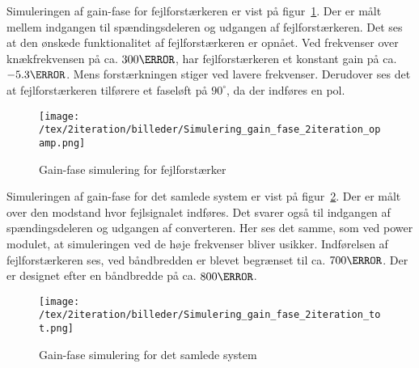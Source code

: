 Simuleringen af gain-fase for fejlforstærkeren er vist på figur~\ref{fig:sim_gain_fase_2iteration_opamp}. Der er målt mellem indgangen til spændingsdeleren og udgangen af fejlforstærkeren. Det ses at den ønskede funktionalitet af fejlforstærkeren er opnået. Ved frekvenser over knækfrekvensen på ca. $300\hertz$, har fejlforstærkeren et konstant gain på ca. $-5.3\decibel$. Mens forstærkningen stiger ved lavere frekvenser. Derudover ses det at fejlforstærkeren tilførere et faseløft på $90^\circ$, da der indføres en pol.

\begin{figure}[H]
	\center
	\texttt{[image: /tex/2iteration/billeder/Simulering\_gain\_fase\_2iteration\_opamp.png]}
	\caption{Gain-fase simulering for fejlforstærker}
	\label{fig:sim_gain_fase_2iteration_opamp}
\end{figure}


Simuleringen af gain-fase for det samlede system er vist på figur~\ref{fig:sim_gain_fase_2iteration_tot}. Der er målt over den modstand hvor fejlsignalet indføres. Det svarer også til indgangen af spændingsdeleren og udgangen af converteren. Her ses det samme, som ved power modulet, at simuleringen ved de høje frekvenser bliver usikker. Indførelsen af fejlforstærkeren ses, ved båndbredden er blevet begrænset til ca. $700\hertz$. Der er designet efter en båndbredde på ca. $800\hertz$. 

\begin{figure}[H]
	\center
	\texttt{[image: /tex/2iteration/billeder/Simulering\_gain\_fase\_2iteration\_tot.png]}
	\caption{Gain-fase simulering for det samlede system}
	\label{fig:sim_gain_fase_2iteration_tot}
\end{figure}




